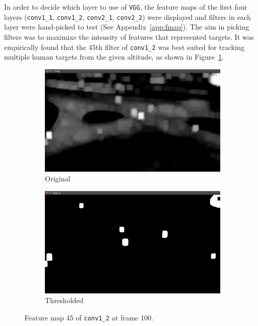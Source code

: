 \documentclass[hidelinks]{article}
\begin{document}
In order to decide which layer to use of \texttt{VGG}, the feature maps of the first four layers (\texttt{conv1\_1}, \texttt{conv1\_2}, \texttt{conv2\_1}, \texttt{conv2\_2}) were displayed and filters in each layer were hand-picked to test (See Appendix~\ref{app:fmap}). The aim in picking filters was to maximixe the intensity of features that represented targets. It was empirically found that the $45$th filter of \texttt{conv1\_2} was best suited for tracking multiple human targets from the given altitude, as shown in Figure~\ref{fig:fmap_orig}.

\begin{figure}[H]
  \centering
  \begin{subfigure}{0.49\textwidth}
    \centering
    \includegraphics[width=\textwidth]{fmap}
    \caption{Original}
    \label{fig:fmap_orig}
  \end{subfigure}
  \begin{subfigure}{0.49\textwidth}
    \centering
    \includegraphics[width=\textwidth]{fmap_th}
    \caption{Thresholded}
    \label{fig:fmap_thresh}
  \end{subfigure}
  
  \caption{Feature map $45$ of \texttt{conv1\_2} at frame 100.}
  \label{fig:fmap}
\end{figure}
\end{document}
